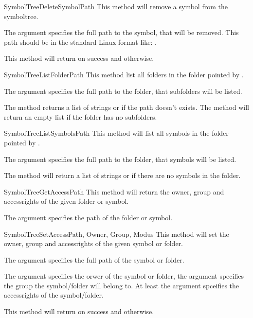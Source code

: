 \begin{methoddesc}[Core]{SymbolTreeDeleteSymbol}{Path}
This method will remove a symbol from the symboltree. 

The argument  specifies the full path to the symbol, that will be removed.
This path should be in the standard Linux format like: .

This method will return  on success and  otherwise.
\end{methoddesc}


\begin{methoddesc}[Core]{SymbolTreeListFolder}{Path}
This method list all folders in the folder pointed by .

The argument  specifies the full path to the folder, that subfolders
will be listed. 

The method returns a list of strings or  if the path doesn't exists. The method will
return an empty list if the folder has no subfolders.
\end{methoddesc}


\begin{methoddesc}[Core]{SymbolTreeListSymbols}{Path}
This method will list all symbols in the folder pointed by .

The argument  specifies the full path to the folder, that symbols
will be listed. 


The method will return a list of strings or  if there are no 
symbols in the folder.
\end{methoddesc}




\begin{methoddesc}[Core]{SymbolTreeGetAccess}{Path}
This method will return the owner, group and accessrights of the given folder or symbol.

The argument  specifies the path of the folder or symbol.
\end{methoddesc}



\begin{methoddesc}[Core]{SymbolTreeSetAccess}{Path, Owner, Group, Modus}
This method will set the owner, group and accessrights of the given symbol or folder.

The argument  specifies the full path of the symbol or folder.

The argument  specifies the orwer of the symbol or folder, the 
argument  specifies the group the symbol/folder will belong to.
At least the argument  spceifies the accessrights of the
symbol/folder.

This method will return  on success and  otherwise.
\end{methoddesc}



